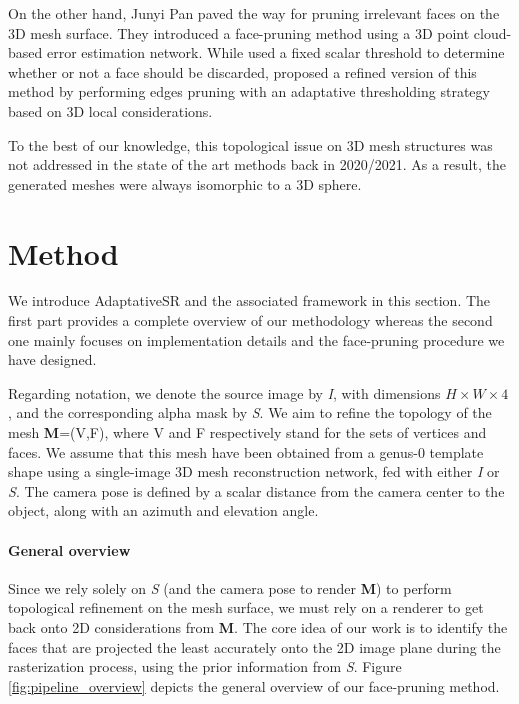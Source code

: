 On the other hand, Junyi Pan \etal \citep{pan2019deep} paved the way for pruning irrelevant faces on the 3D mesh surface. They introduced a face-pruning method using a 3D point cloud-based error estimation network. While \citep{pan2019deep} used a fixed scalar threshold to determine whether or not a face should be discarded, \citep{nie2020total3dunderstanding} proposed a refined version of this method by performing edges pruning with an adaptative thresholding strategy based on 3D local considerations.

To the best of our knowledge, this topological issue on 3D mesh structures was not addressed in the state of the art methods back in 2020/2021. As a result, the generated meshes were always isomorphic to a 3D sphere.

\section{Method}
\label{sec:method}

We introduce AdaptativeSR and the associated framework in this section. The first part provides a complete overview of our methodology whereas the second one mainly focuses on implementation details and the face-pruning procedure we have designed. 

Regarding notation, we denote the source image by \textit{I}, with dimensions $H\times W \times 4$, and the corresponding alpha mask by \textit{S}. We aim to refine the topology of the mesh \textbf{M}=(V,F), where V and F respectively stand for the sets of vertices and faces. We assume that this mesh have been obtained from a genus-0 template shape using a single-image 3D mesh reconstruction network, fed with either \textit{I} or \textit{S}. The camera pose is defined by a scalar distance from the camera center to the object, along with an azimuth and elevation angle. 

\paragraph{General overview} Since we rely solely on \textit{S} (and the camera pose to render \textbf{M}) to perform topological refinement on the mesh surface, we must rely on a renderer to get back onto 2D considerations from  \textbf{M}. The core idea of our work is to identify the faces that are projected the least accurately onto the 2D image plane during the rasterization process, using the prior information from \textit{S}. Figure \ref{fig:pipeline_overview} depicts the general overview of our face-pruning method.

